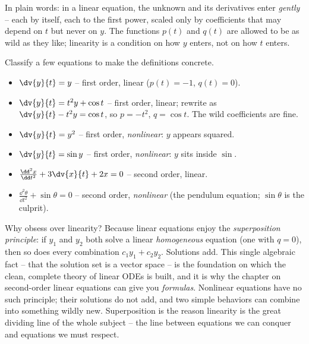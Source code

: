 In plain words: in a linear equation, the unknown and its derivatives enter \emph{gently} -- each by itself, each to the first power, scaled only by coefficients that may depend on $t$ but never on $y$. The functions $p(t)$ and $q(t)$ are allowed to be as wild as they like; linearity is a condition on how $y$ enters, not on how $t$ enters.

\begin{example}
\label{ch36:ex-classify}
Classify a few equations to make the definitions concrete.
\begin{itemize}
  \item $\dv{y}{t} = y$ \quad -- first order, linear ($p(t) = -1$, $q(t)=0$).
  \item $\dv{y}{t} = t^2 y + \cos t$ \quad -- first order, linear; rewrite as $\dv{y}{t} - t^2 y = \cos t$, so $p = -t^2$, $q = \cos t$. The wild coefficients are fine.
  \item $\dv{y}{t} = y^2$ \quad -- first order, \emph{nonlinear}: $y$ appears squared.
  \item $\dv{y}{t} = \sin y$ \quad -- first order, \emph{nonlinear}: $y$ sits inside $\sin$.
  \item $\frac{\dd^2 x}{\dd t^2} + 3\dv{x}{t} + 2x = 0$ \quad -- second order, linear.
  \item $\frac{\dd^2 \theta}{\dd t^2} + \sin\theta = 0$ \quad -- second order, \emph{nonlinear} (the pendulum equation; $\sin\theta$ is the culprit).
\end{itemize}
\end{example}

\begin{aestheticbox}
Why obsess over linearity? Because linear equations enjoy the \emph{superposition principle}: if $y_1$ and $y_2$ both solve a linear \emph{homogeneous} equation (one with $q=0$), then so does every combination $c_1 y_1 + c_2 y_2$. Solutions add. This single algebraic fact -- that the solution set is a vector space -- is the foundation on which the clean, complete theory of linear ODEs is built, and it is why the chapter on second-order linear equations can give you \emph{formulas}. Nonlinear equations have no such principle; their solutions do not add, and two simple behaviors can combine into something wildly new. Superposition is the reason linearity is the great dividing line of the whole subject -- the line between equations we can conquer and equations we must respect.
\end{aestheticbox}

